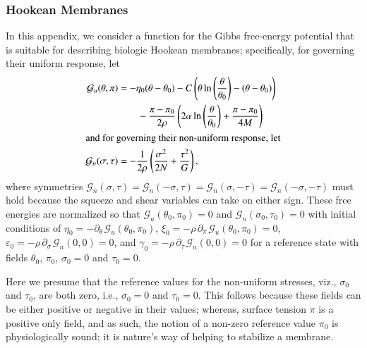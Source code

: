 \subsubsection{Hookean Membranes}

In this appendix, we consider a function for the Gibbs free-energy potential that is suitable for describing biologic Hookean membranes; specifically, for governing their uniform response, let
\begin{subequations}
    \label{GibbsMembraneEnergy}
    \begin{align}
    \mathcal{G}_u ( \theta , \pi ) & = -\eta_0 (\theta - \theta_0) -
    C \left( \theta \ln \left( \frac{\theta}{\theta_0} \right) - 
    ( \theta - \theta_0 ) \right) \notag \\
    \mbox{} & \qquad - \frac{\pi - \pi_0}{2 \rho} \left( 
    2\alpha \ln \left( \frac{\theta}{\theta_0} \right) + 
    \frac{\pi - \pi_0}{4M} \right) 
    \label{membraneUniform} \\
    \intertext{and for governing their non-uniform response, let}
    \mathcal{G}_n ( \sigma , \tau ) & = -\frac{1}{2 \rho} 
    \left( \frac{\sigma^2}{2N} + \frac{\tau^2}{G} \right),
    \label{membraneNonUniform}
    \end{align}
\end{subequations}
where symmetries $\mathcal{G}_n ( \sigma , \tau ) = \mathcal{G}_n ( -\sigma , \tau ) = \mathcal{G}_n ( \sigma , -\tau ) = \mathcal{G}_n ( -\sigma , -\tau )$ must hold because the squeeze and shear variables can take on either sign.  These free energies are normalized so that $\mathcal{G}_u (\theta_0 , \pi_0) = 0$ and $\mathcal{G}_n ( \sigma_0, \tau_0 ) = 0$ with initial conditions of $\eta_0 = -\partial_{\theta\,} \mathcal{G}_u (\theta_0 , \pi_0)$, $\xi_0 = -\rho \, \partial_{\pi\,} \mathcal{G}_u (\theta_0 , \pi_0) = 0$, $\varepsilon_0 = -\rho \, \partial_{\sigma\,} \mathcal{G}_n (0 , 0) = 0$, and $\gamma_0 = -\rho \, \partial_{\tau\,} \mathcal{G}_n (0 , 0) = 0$ for a reference state with fields $\theta_0$, $\pi_0$, $\sigma_0 = 0$ and $\tau_0 = 0$.

Here we presume that the reference values for the non-uniform stresses, viz., $\sigma_0$ and $\tau_0$, are both zero, i.e., $\sigma_0 = 0$ and $\tau_0 = 0$.  This follows because these fields can be either positive or negative in their values; whereas, surface tension $\pi$ is a positive only field, and as such, the notion of a non-zero reference value $\pi_0$ is physiologically sound; it is nature's way of helping to stabilize a membrane.

